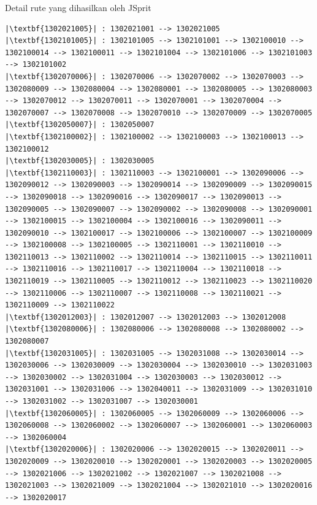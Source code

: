 \begin{listing}[!]
	\captionsetup{format=hang}
	\caption{Detail rute yang dihasilkan oleh JSprit}
	\label{lst:analysis_mtsp_recommendation}
	\begin{verbatim}
|\textbf{1302021005}| : 1302021001 --> 1302021005
|\textbf{1302101005}| : 1302101005 --> 1302101001 --> 1302100010 --> 1302100014 --> 1302100011 --> 1302101004 --> 1302101006 --> 1302101003 --> 1302101002
|\textbf{1302070006}| : 1302070006 --> 1302070002 --> 1302070003 --> 1302080009 --> 1302080004 --> 1302080001 --> 1302080005 --> 1302080003 --> 1302070012 --> 1302070011 --> 1302070001 --> 1302070004 --> 1302070007 --> 1302070008 --> 1302070010 --> 1302070009 --> 1302070005
|\textbf{1302050007}| : 1302050007
|\textbf{1302100002}| : 1302100002 --> 1302100003 --> 1302100013 --> 1302100012
|\textbf{1302030005}| : 1302030005
|\textbf{1302110003}| : 1302110003 --> 1302100001 --> 1302090006 --> 1302090012 --> 1302090003 --> 1302090014 --> 1302090009 --> 1302090015 --> 1302090018 --> 1302090016 --> 1302090017 --> 1302090013 --> 1302090005 --> 1302090007 --> 1302090002 --> 1302090008 --> 1302090001 --> 1302100015 --> 1302100004 --> 1302100016 --> 1302090011 --> 1302090010 --> 1302100017 --> 1302100006 --> 1302100007 --> 1302100009 --> 1302100008 --> 1302100005 --> 1302110001 --> 1302110010 --> 1302110013 --> 1302110002 --> 1302110014 --> 1302110015 --> 1302110011 --> 1302110016 --> 1302110017 --> 1302110004 --> 1302110018 --> 1302110019 --> 1302110005 --> 1302110012 --> 1302110023 --> 1302110020 --> 1302110006 --> 1302110007 --> 1302110008 --> 1302110021 --> 1302110009 --> 1302110022
|\textbf{1302012003}| : 1302012007 --> 1302012003 --> 1302012008
|\textbf{1302080006}| : 1302080006 --> 1302080008 --> 1302080002 --> 1302080007
|\textbf{1302031005}| : 1302031005 --> 1302031008 --> 1302030014 --> 1302030006 --> 1302030009 --> 1302030004 --> 1302030010 --> 1302031003 --> 1302030002 --> 1302031004 --> 1302030003 --> 1302030012 --> 1302031001 --> 1302031006 --> 1302040011 --> 1302031009 --> 1302031010 --> 1302031002 --> 1302031007 --> 1302030001
|\textbf{1302060005}| : 1302060005 --> 1302060009 --> 1302060006 --> 1302060008 --> 1302060002 --> 1302060007 --> 1302060001 --> 1302060003 --> 1302060004
|\textbf{1302020006}| : 1302020006 --> 1302020015 --> 1302020011 --> 1302020009 --> 1302020010 --> 1302020001 --> 1302020003 --> 1302020005 --> 1302021006 --> 1302021002 --> 1302021007 --> 1302021008 --> 1302021003 --> 1302021009 --> 1302021004 --> 1302021010 --> 1302020016 --> 1302020017

\end{verbatim}
\end{listing}
